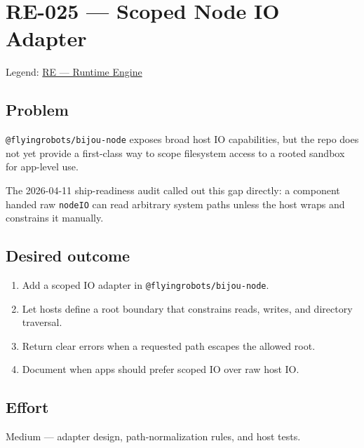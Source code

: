 \chapter{RE-025 --- Scoped Node IO Adapter}\label{record-382}

\smallskip

Legend: \href{https://github.com/flyingrobots/bijou/blob/cbd70612140e7a450d764b3c7be1c6af878b99bc/docs/method/graveyard/legends/RE-runtime-engine.md}{RE --- Runtime Engine}

\section{Problem}\label{record-382-problem}

\texttt{@\allowbreak{}f\allowbreak{}l\allowbreak{}y\allowbreak{}i\allowbreak{}n\allowbreak{}g\allowbreak{}r\allowbreak{}o\allowbreak{}b\allowbreak{}o\allowbreak{}t\allowbreak{}s\allowbreak{}/\allowbreak{}b\allowbreak{}i\allowbreak{}j\allowbreak{}o\allowbreak{}u\allowbreak{}-\allowbreak{}n\allowbreak{}o\allowbreak{}d\allowbreak{}e} exposes broad host IO capabilities, but the repo does not yet provide a first-class way to scope filesystem access to a rooted sandbox for app-level use.

The 2026-04-11 ship-readiness audit called out this gap directly: a component handed raw \texttt{n\allowbreak{}o\allowbreak{}d\allowbreak{}e\allowbreak{}I\allowbreak{}O} can read arbitrary system paths unless the host wraps and constrains it manually.

\section{Desired outcome}\label{record-382-desired-outcome}

\begin{enumerate}
\def\labelenumi{\arabic{enumi}.}
\tightlist
\item
  Add a scoped IO adapter in \texttt{@\allowbreak{}f\allowbreak{}l\allowbreak{}y\allowbreak{}i\allowbreak{}n\allowbreak{}g\allowbreak{}r\allowbreak{}o\allowbreak{}b\allowbreak{}o\allowbreak{}t\allowbreak{}s\allowbreak{}/\allowbreak{}b\allowbreak{}i\allowbreak{}j\allowbreak{}o\allowbreak{}u\allowbreak{}-\allowbreak{}n\allowbreak{}o\allowbreak{}d\allowbreak{}e}.
\item
  Let hosts define a root boundary that constrains reads, writes, and directory traversal.
\item
  Return clear errors when a requested path escapes the allowed root.
\item
  Document when apps should prefer scoped IO over raw host IO.
\end{enumerate}

\section{Effort}\label{record-382-effort}

Medium --- adapter design, path-normalization rules, and host tests.

